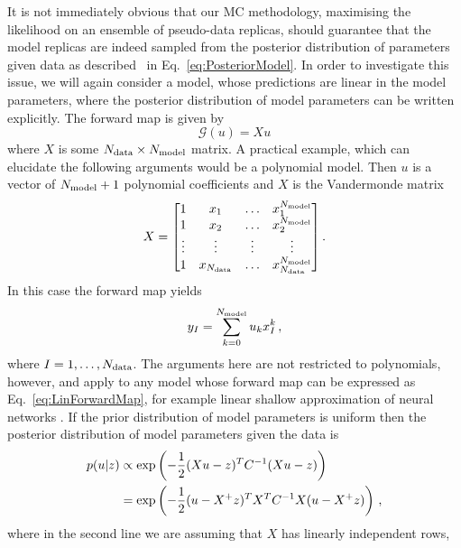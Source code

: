 It is not immediately obvious that our MC methodology, maximising the likelihood
on an ensemble of pseudo-data replicas, should guarantee that the model replicas
are indeed sampled from the posterior distribution of parameters given data as
described \eg\ in Eq.~\ref{eq:PosteriorModel}. In order to investigate this
issue, we will again consider a model, whose predictions are linear in the model
parameters, where the posterior distribution of model parameters can be written
explicitly. The forward map is given by
\begin{equation}\label{eq:LinForwardMap}
    \mathcal G(u) = X u
\end{equation}
where $X$ is some $N_{\rm data}\times N_{\rm model}$ matrix. A practical example, which can
elucidate the following arguments would be a polynomial model. Then $u$ is a
vector of $N_{\rm model}+1$ polynomial coefficients and $X$ is the Vandermonde matrix
\begin{equation}
    X =
    \begin{bmatrix}
        1  & x_1 & \ldots& x_1^{N_{\rm model}} \\ 
        1  & x_2 & \ldots& x_2^{N_{\rm model}} \\ 
        \vdots  & \vdots & \vdots& \vdots \\ 
        1  & x_{N_{\rm data}} & \ldots & x_{N_{\rm data}}^{N_{\rm model}} 
    \end{bmatrix}.
\end{equation}
In this case the forward map yields
\begin{equation}
    \label{eq:PolyMod}
    y_I = \sum_{k=0}^{N_{\rm model}} u_k x_I^k\, , 
\end{equation}
where $I=1,\ldots,N_{\rm data}$. The arguments here are not restricted to polynomials,
however, and apply to any model whose forward map can be expressed as
Eq.~\eqref{eq:LinForwardMap}, for example linear shallow approximation of neural
networks \cite{ADVANI2020428}. If the prior distribution of model parameters is
uniform then the posterior distribution of model parameters given the data is
\begin{equation}
    \label{eq:PosteriorMultiGaussModel}
    \begin{split}
        p(u | z) &\propto
        \exp \left( -\frac{1}{2} (Xu - z)^T C^{-1}_{} (Xu - z)\right) \\
        &= \exp \left( -\frac{1}{2} (u - X^+z)^T X^TC^{-1}_{}X (u - X^+z)\right)\, ,
    \end{split}
\end{equation}
where in the second line we are assuming that $X$ has linearly independent rows,
